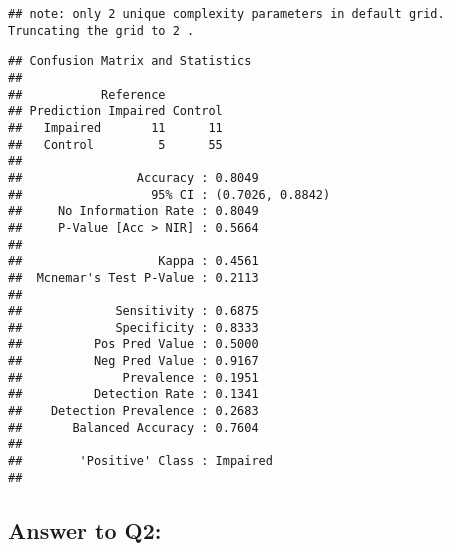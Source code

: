 \documentclass[]{article}
\newenvironment{Shaded}{\begin{snugshade}}{\end{snugshade}}
\newcommand{\KeywordTok}[1]{\textcolor[rgb]{0.13,0.29,0.53}{\textbf{#1}}}
\newcommand{\DataTypeTok}[1]{\textcolor[rgb]{0.13,0.29,0.53}{#1}}
\newcommand{\StringTok}[1]{\textcolor[rgb]{0.31,0.60,0.02}{#1}}
\newcommand{\CommentTok}[1]{\textcolor[rgb]{0.56,0.35,0.01}{\textit{#1}}}
\newcommand{\OperatorTok}[1]{\textcolor[rgb]{0.81,0.36,0.00}{\textbf{#1}}}
\newcommand{\NormalTok}[1]{#1}
\begin{document}
\begin{Shaded}
\end{Shaded}

\begin{verbatim}
## note: only 2 unique complexity parameters in default grid. Truncating the grid to 2 .
\end{verbatim}

\begin{Shaded}
\end{Shaded}

\begin{verbatim}
## Confusion Matrix and Statistics
## 
##           Reference
## Prediction Impaired Control
##   Impaired       11      11
##   Control         5      55
##                                           
##                Accuracy : 0.8049          
##                  95% CI : (0.7026, 0.8842)
##     No Information Rate : 0.8049          
##     P-Value [Acc > NIR] : 0.5664          
##                                           
##                   Kappa : 0.4561          
##  Mcnemar's Test P-Value : 0.2113          
##                                           
##             Sensitivity : 0.6875          
##             Specificity : 0.8333          
##          Pos Pred Value : 0.5000          
##          Neg Pred Value : 0.9167          
##              Prevalence : 0.1951          
##          Detection Rate : 0.1341          
##    Detection Prevalence : 0.2683          
##       Balanced Accuracy : 0.7604          
##                                           
##        'Positive' Class : Impaired        
## 
\end{verbatim}

\subsection{Answer to Q2:}\label{answer-to-q2}
\end{document}
